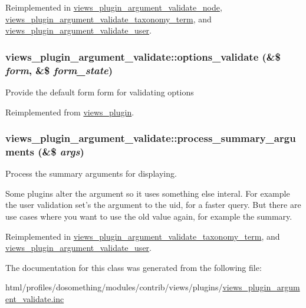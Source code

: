Reimplemented in \hyperlink{classviews__plugin__argument__validate__node_a81cd20811df44e2798d085a50902c5a3}{views\_\-plugin\_\-argument\_\-validate\_\-node}, \hyperlink{classviews__plugin__argument__validate__taxonomy__term_a2259ff87ac45f7a4862f89983869f580}{views\_\-plugin\_\-argument\_\-validate\_\-taxonomy\_\-term}, and \hyperlink{classviews__plugin__argument__validate__user_afdcb2900871aef06cd2263afebabe99f}{views\_\-plugin\_\-argument\_\-validate\_\-user}.\hypertarget{classviews__plugin__argument__validate_a3b9d9986adaf8e1d57d5b1b62ab712b0}{
\subsubsection[{options\_\-validate}]{\setlength{\rightskip}{0pt plus 5cm}views\_\-plugin\_\-argument\_\-validate::options\_\-validate (\&\$ {\em form}, \/  \&\$ {\em form\_\-state})}}
\label{classviews__plugin__argument__validate_a3b9d9986adaf8e1d57d5b1b62ab712b0}
Provide the default form form for validating options 

Reimplemented from \hyperlink{classviews__plugin_a46d72eb35feea36fed83cd1355a47431}{views\_\-plugin}.\hypertarget{classviews__plugin__argument__validate_a35ebaf052ae4653ae5134afc11883c05}{
\subsubsection[{process\_\-summary\_\-arguments}]{\setlength{\rightskip}{0pt plus 5cm}views\_\-plugin\_\-argument\_\-validate::process\_\-summary\_\-arguments (\&\$ {\em args})}}
\label{classviews__plugin__argument__validate_a35ebaf052ae4653ae5134afc11883c05}
Process the summary arguments for displaying.

Some plugins alter the argument so it uses something else interal. For example the user validation set's the argument to the uid, for a faster query. But there are use cases where you want to use the old value again, for example the summary. 

Reimplemented in \hyperlink{classviews__plugin__argument__validate__taxonomy__term_a6019c52239ae10eb1023624c2db9e24f}{views\_\-plugin\_\-argument\_\-validate\_\-taxonomy\_\-term}, and \hyperlink{classviews__plugin__argument__validate__user_af49e3a8adbb930ba83d0343d7d12db0f}{views\_\-plugin\_\-argument\_\-validate\_\-user}.

The documentation for this class was generated from the following file:\begin{DoxyCompactItemize}
\item 
html/profiles/dosomething/modules/contrib/views/plugins/\hyperlink{views__plugin__argument__validate_8inc}{views\_\-plugin\_\-argument\_\-validate.inc}\end{DoxyCompactItemize}
